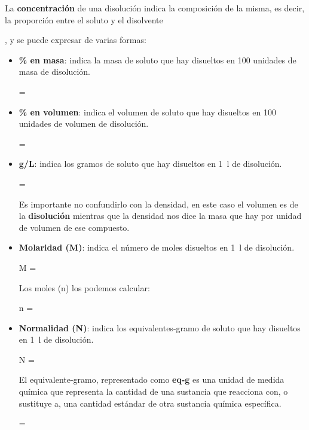 \begin{definition}[Concentración]
    La \textbf{concentración} de una disolución indica la composición de la misma, es decir, la proporción entre el soluto y el disolvente
\end{definition}
, y se puede expresar de varias formas:
\begin{itemize}
    \item \textbf{\% en masa}: indica la masa de soluto que hay disueltos en 100 unidades de masa de disolución.
    \begin{centeredequation}
         =  
    \end{centeredequation}
    \item \textbf{\% en volumen}: indica el volumen de soluto que hay disueltos en 100 unidades de volumen de disolución.
    \begin{centeredequation}
         =  
    \end{centeredequation}
    \item \textbf{g/L}: indica los gramos de soluto que hay disueltos en \qty{1}{\litre} de disolución.
    \begin{centeredequation}
         = 
    \end{centeredequation}
    \begin{remark}
        Es importante no confundirlo con la densidad, en este caso el volumen es de la \textbf{disolución} mientras que la densidad nos dice la masa que hay por unidad de volumen de ese compuesto.
    \end{remark}
    \item \textbf{Molaridad (M)}: indica el número de moles disueltos en \qty{1}{\litre} de disolución.
    \begin{centeredequation}
        M = 
    \end{centeredequation}
    Los moles (n) los podemos calcular:
    \begin{centeredequation}
        n = 
    \end{centeredequation}
    \item \textbf{Normalidad (N)}: indica los equivalentes-gramo de soluto que hay disueltos en \qty{1}{\litre} de disolución.
    \begin{centeredequation}
        N = 
    \end{centeredequation}
    El equivalente-gramo, representado como \textbf{eq-g} es una unidad de medida química que representa la cantidad de una sustancia que reacciona con, o sustituye a, una cantidad estándar de otra sustancia química específica.
    \begin{centeredequation}
         = 
    \end{centeredequation}


\end{itemize}
